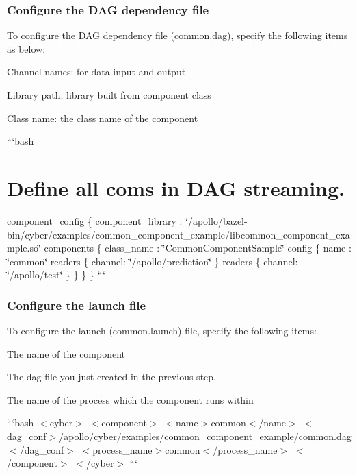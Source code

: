 \subsubsection*{Configure the D\-A\-G dependency file}

To configure the D\-A\-G dependency file (common.\-dag), specify the following items as below\-:


\begin{DoxyItemize}
\item Channel names\-: for data input and output
\item Library path\-: library built from component class
\item Class name\-: the class name of the component
\end{DoxyItemize}

```bash \section*{Define all coms in D\-A\-G streaming.}

component\-\_\-config \{ component\-\_\-library \-: \char`\"{}/apollo/bazel-\/bin/cyber/examples/common\-\_\-component\-\_\-example/libcommon\-\_\-component\-\_\-example.\-so\char`\"{} components \{ class\-\_\-name \-: \char`\"{}\-Common\-Component\-Sample\char`\"{} config \{ name \-: \char`\"{}common\char`\"{} readers \{ channel\-: \char`\"{}/apollo/prediction\char`\"{} \} readers \{ channel\-: \char`\"{}/apollo/test\char`\"{} \} \} \} \} ```

\subsubsection*{Configure the launch file}

To configure the launch (common.\-launch) file, specify the following items\-:


\begin{DoxyItemize}
\item The name of the component
\item The dag file you just created in the previous step.
\item The name of the process which the component runs within
\end{DoxyItemize}

```bash $<$cyber$>$ $<$component$>$ $<$name$>$common$<$/name$>$ $<$dag\-\_\-conf$>$/apollo/cyber/examples/common\-\_\-component\-\_\-example/common.dag$<$/dag\-\_\-conf$>$ $<$process\-\_\-name$>$common$<$/process\-\_\-name$>$ $<$/component$>$ $<$/cyber$>$ ```

